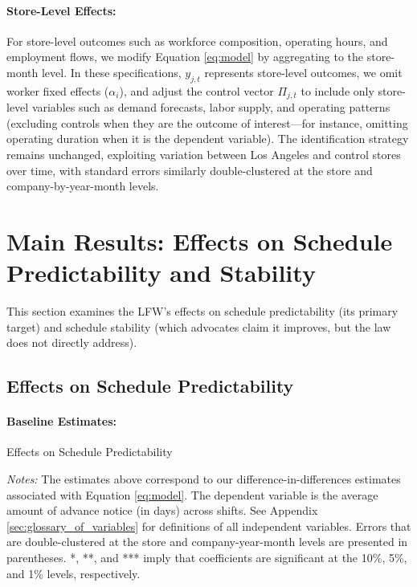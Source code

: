 \documentclass[letterpaper,11pt,leqno]{article}
\theoremstyle{paper}
\newcommand{\note}[2][]{\parbox{\textwidth}{\footnotesize\vspace*{10pt}\textit{#1}#2}}
\begin{document}
\paragraph{Store-Level Effects:}
For store-level outcomes such as workforce composition, operating hours, and employment flows, we modify Equation \ref{eq:model} by aggregating to the store-month level. In these specifications, $y_{j,t}$ represents store-level outcomes, we omit worker fixed effects ($\alpha_i$), and adjust the control vector $\Pi_{j,t}$ to include only store-level variables such as demand forecasts, labor supply, and operating patterns (excluding controls when they are the outcome of interest—for instance, omitting operating duration when it is the dependent variable). The identification strategy remains unchanged, exploiting variation between Los Angeles and control stores over time, with standard errors similarly double-clustered at the store and company-by-year-month levels.


\section{Main Results: Effects on Schedule Predictability and Stability} \label{sec:main_results}

This section examines the LFW's effects on schedule predictability (its primary target) and schedule stability (which advocates claim it improves, but the law does not directly address).

\subsection{Effects on Schedule Predictability} \label{subsec:advance_notice}

\paragraph{Baseline Estimates:}

\begin{singlespace}
\begin{table}[h]
\caption{Effects on Schedule Predictability}

\scriptsize 
\note{\textit{Notes: } The estimates above correspond to our difference-in-differences estimates associated with Equation \ref{eq:model}. The dependent variable is the average amount of advance notice (in days) across shifts. See Appendix \ref{sec:glossary_of_variables} for definitions of all independent variables. Errors that are double-clustered at the store and company-year-month levels are presented in parentheses. *, **, and *** imply that coefficients are significant at the 10\%, 5\%, and 1\% levels, respectively.}
\label{table:adv_notice}
\end{table}
\end{singlespace}
\end{document}
